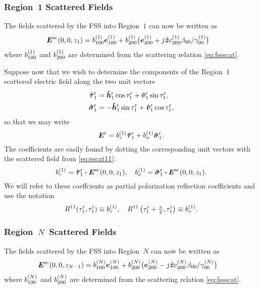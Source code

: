 \documentclass[11pt]{article}
\renewcommand{\inc}{^{\text{i}}}
\renewcommand{\refl}{^{\text{r}}}
\newcommand{\piotwo}{{\textstyle\frac{\pi}{2}}}
\begin{document}
\subsubsection{Region~1 Scattered Fields}

The fields scattered by the FSS into Region~$1$ can now be written as
\begin{align}
  \boldsymbol{E}^{\text{sc}}(0,0,z_1)
  &=
  b^{(1)}_{100} \boldsymbol{e}^{(1)}_{100} + b^{(1)}_{200} \bigl(\boldsymbol{e}^{(1)}_{200} +
   j \boldsymbol{\hat{z}} c_{200}^{(1)} \beta_{00} / \gamma_{00}^{(1)}  \bigr)
   \label{eq:escat11}
\end{align}
where $b^{(1)}_{100}$ and $b^{(1)}_{200}$ are determined from the
scattering relation \eqref{eq:fssscat}.  

Suppose now that we wish to determine the components of the Region~1
scattered electric field along the two unit vectors 
\begin{subequations}
\begin{align}
  \tauhat_1\refl 
  & = \hhat_1\refl \cos \tau_1\refl + \vhat_1\refl \sin \tau_1\refl, \\
  \sigmahat_1\refl 
  & = - \hhat_1\refl \sin \tau_1\refl + 
  \vhat_1\refl \cos \tau_1\refl,
\end{align}
\end{subequations}
so that we may write
\begin{equation}
  \E\refl = b_\tau\one \tauhat_1\refl + b_\sigma\one \sigmahat_1\refl.
\end{equation}
The coefficients are easily found by dotting the corresponding unit
vectors with the scattered field from \eqref{eq:escat11}:
\begin{equation}
  b_\tau\one = \tauhat_1\refl \bdot   \E\scat(0,0,z_1), \quad
  b_\sigma\one = \sigmahat_1\refl \bdot   \E\scat(0,0,z_1).
\end{equation}
We will refer to these coeffcients as partial polarization reflection
coefficients and use the notation
\begin{equation}
  R^{11}(\tau_1\refl,\tau_1\inc) \equiv b_\tau\one, \quad
  R^{11}\left(\tau_1\refl+\piotwo,\tau_1\inc\right) \equiv b_\sigma\one.
\end{equation}



\subsubsection[Region~\textit{N}~Scattered Fields]{Region~\boldmath$N$\unboldmath~Scattered Fields}

The fields scattered by the FSS into Region~$N$ can now be written as
\begin{align}
  \boldsymbol{E}^{\text{sc}}(0,0,z_{N-1})
  &=
  b^{(N)}_{100} \boldsymbol{e}^{(N)}_{100} + b^{(N)}_{200} \bigl(\boldsymbol{e}^{(N)}_{200} -
   j \boldsymbol{\hat{z}} c_{200}^{(N)} \beta_{00} / \gamma_{00}^{(N)}  \bigr)
   \label{eq:escatN1}
\end{align}
where $b^{(N)}_{100}$ and $b^{(N)}_{200}$ are determined from the
scattering relation \eqref{eq:fssscat}.  
\end{document}
